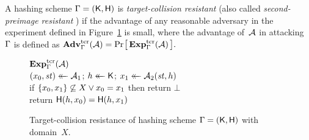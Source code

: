 A hashing scheme $\mathrm{\Gamma} = (\mathsf{K}, \mathsf{H})$ is \emph{target-collision
resistant} (also called \emph{second-preimage resistant} \cite{rs04}) if the
advantage of any reasonable adversary in the \tcr experiment defined in
Figure~\ref{fig-tcr} is small, where the advantage of~$\mathcal{A}$ in
attacking~$\mathrm{\Gamma}$ is defined as
$
  \Adv{\tcr}_\hashscheme(\advA) = \prob{ \Exp{\tcr}_\hashscheme(\advA) }.
$
\begin{figure}
  {
    \underline{$\Exp{\tcr}_\hashscheme(\advA)$}\\[2pt]
      $(x_0, \mathit{st}) \mathrel{\leftarrow\mkern-14mu\leftarrow} \mathcal{A}_1$;
      $h \mathrel{\leftarrow\mkern-14mu\leftarrow} \mathsf{K}$;
      $x_1 \mathrel{\leftarrow\mkern-14mu\leftarrow} \mathcal{A}_2(\mathit{st}, h)$\\
      if $\{x_0, x_1\} \not\subseteq X \vee x_0 = x_1$ then return $\bot$\\
      return $\mathsf{H}(h, x_0) = \mathsf{H}(h, x_1)$
  }
  \caption{Target-collision resistance of hashing scheme $\mathrm{\Gamma} =
  (\mathsf{K}, \mathsf{H})$ with domain~$X$.}
  \label{fig-tcr}
\end{figure}
\fi
